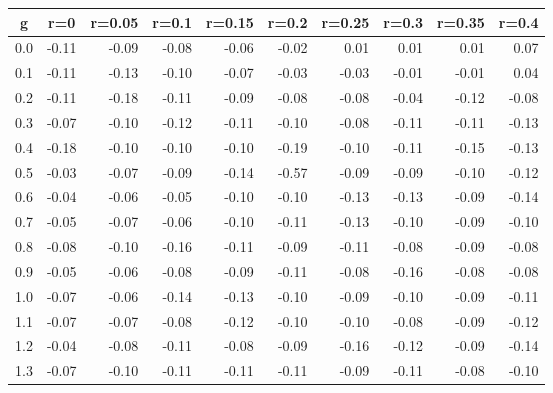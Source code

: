 %
\begin{table}[!tbp]
 \begin{center}
 \begin{tabular}{rrrrrrrrrr}\hline\hline
\multicolumn{1}{c}{g}&\multicolumn{1}{c}{r=0}&\multicolumn{1}{c}{r=0.05}&\multicolumn{1}{c}{r=0.1}&\multicolumn{1}{c}{r=0.15}&\multicolumn{1}{c}{r=0.2}&\multicolumn{1}{c}{r=0.25}&\multicolumn{1}{c}{r=0.3}&\multicolumn{1}{c}{r=0.35}&\multicolumn{1}{c}{r=0.4}\tabularnewline
\hline
0.0&-0.11&-0.09&-0.08&-0.06&-0.02& 0.01& 0.01& 0.01& 0.07\tabularnewline
0.1&-0.11&-0.13&-0.10&-0.07&-0.03&-0.03&-0.01&-0.01& 0.04\tabularnewline
0.2&-0.11&-0.18&-0.11&-0.09&-0.08&-0.08&-0.04&-0.12&-0.08\tabularnewline
0.3&-0.07&-0.10&-0.12&-0.11&-0.10&-0.08&-0.11&-0.11&-0.13\tabularnewline
0.4&-0.18&-0.10&-0.10&-0.10&-0.19&-0.10&-0.11&-0.15&-0.13\tabularnewline
0.5&-0.03&-0.07&-0.09&-0.14&-0.57&-0.09&-0.09&-0.10&-0.12\tabularnewline
0.6&-0.04&-0.06&-0.05&-0.10&-0.10&-0.13&-0.13&-0.09&-0.14\tabularnewline
0.7&-0.05&-0.07&-0.06&-0.10&-0.11&-0.13&-0.10&-0.09&-0.10\tabularnewline
0.8&-0.08&-0.10&-0.16&-0.11&-0.09&-0.11&-0.08&-0.09&-0.08\tabularnewline
0.9&-0.05&-0.06&-0.08&-0.09&-0.11&-0.08&-0.16&-0.08&-0.08\tabularnewline
1.0&-0.07&-0.06&-0.14&-0.13&-0.10&-0.09&-0.10&-0.09&-0.11\tabularnewline
1.1&-0.07&-0.07&-0.08&-0.12&-0.10&-0.10&-0.08&-0.09&-0.12\tabularnewline
1.2&-0.04&-0.08&-0.11&-0.08&-0.09&-0.16&-0.12&-0.09&-0.14\tabularnewline
1.3&-0.07&-0.10&-0.11&-0.11&-0.11&-0.09&-0.11&-0.08&-0.10\tabularnewline
\hline
\end{tabular}

\end{center}

\end{table}

